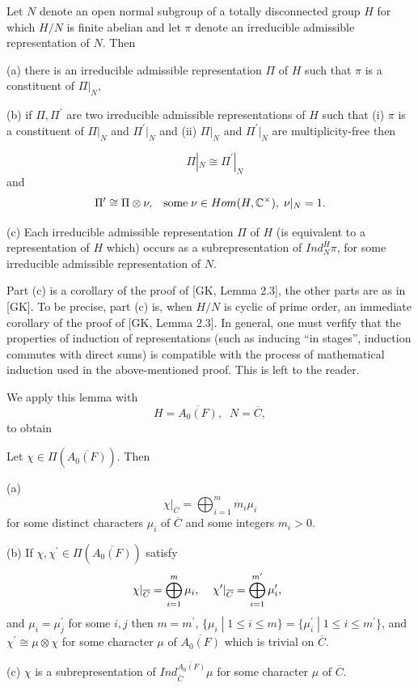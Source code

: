 \begin{lemma}
Let $N$ denote an open normal subgroup of a totally disconnected group $H$
for which $H/N$ is finite abelian and let $\pi $ denote an irreducible
admissible representation of $N$. Then

(a) there is an irreducible admissible representation $\Pi $ of $H$ such
that $\pi $ is a constituent of $\Pi |_N,$

(b) if $\Pi ,\Pi ^{\prime }$ are two irreducible admissible representations
of $H$ such that (i) $\pi $ is a constituent of $\Pi |_N$ and
$\Pi ^{\prime}|_N$ and (ii) $\Pi |_N$ and $\Pi ^{\prime }|_N$ are
multiplicity-free then 

\[
\;\;\;\Pi |_N\cong \Pi ^{\prime }|_N
\]
and 
\[
\Pi ^{\prime }\cong \Pi \otimes \nu ,\;\;\;{\rm some}\;\nu
\in Hom(H,{\Bbb C}^{\times }),\;\nu |_N=1.
\]

(c) Each irreducible admissible representation $\Pi $ of $H$ (is equivalent
to a representation of $H$ which) occurs as a subrepresentation of
$Ind_N^H\pi $, for some irreducible admissible representation of $N$.
\end{lemma}

\begin{remark}
Part (c) is a corollary of the proof of [GK, Lemma 2.3], the other parts are
as in [GK]. To be precise, part (c) is, when $H/N$ is cyclic of prime order,
an immediate corollary of the proof of [GK, Lemma 2.3]. In general, one must
verfify that the properties of induction of representations (such as
inducing ``in stages'', induction commutes with direct sums) is compatible
with the process of mathematical induction used in the above-mentioned
proof. This is left to the reader.
\end{remark}

We apply this lemma with 
\[
H=\overline{A_0(F)},\;\;N=\overline{C}, 
\]
to obtain

\begin{lemma}
Let $\chi \in \Pi (\overline{A_0(F)})$. Then

(a) 
\[
\chi |_{\overline{C}}=\bigoplus_{i=1}^mm_i\mu _i
\]
for some distinct characters $\mu _i$ of $\overline{C}$ and some integers $%
m_i>0$.

(b) If $\chi ,\chi ^{\prime }\in \Pi (\overline{A_0(F)})$ satisfy 
\[
\chi |_{\overline{C}}=\bigoplus_{i=1}^m\mu _i,\;\;\;\;\chi ^{\prime }|_{%
\overline{C}}=\bigoplus_{i=1}^{m^{\prime }}\mu _i^{\prime },\;\;
\]
and $\mu _i=\mu _j^{\prime }$ for some $i,j$ then $m=m^{\prime }$, $\{\mu
_i\;|\;1\leq i\leq m\}=\{\mu _i^{\prime }\;|\;1\leq i\leq m^{\prime }\}$,
and $\chi ^{\prime }\cong \mu \otimes \chi $ for some character $\mu $ of $%
\overline{A_0(F)}$ which is trivial on $\overline{C}$.

(c) $\chi $ is a subrepresentation of $Ind_{\overline{C}}^{\overline{A_0(F)}%
}\mu $ for some character $\mu $ of $\overline{C}$.
\end{lemma}

